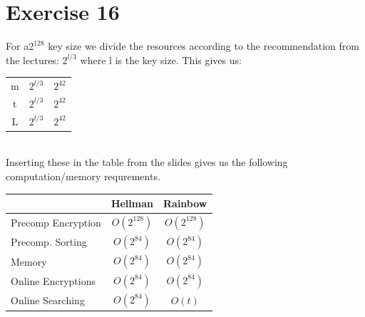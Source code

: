 \section*{Exercise 16}
For a$2^{128}$ key size we divide the resources according to the recommendation
from the lectures: $2^{l/3}$ where l is the key size. This gives us:\\
\begin{tabular}{c|c|c}
m & $2^{l/3} $&$ 2^{42}$\\
t & $2^{l/3} $&$ 2^{42}$\\
L & $2^{l/3} $&$ 2^{42}$
\end{tabular}\\
Inserting these in the table from the slides gives us the following
computation/memory requrements.\\
\begin{tabular}{l|cc}
\  & Hellman & Rainbow\\\hline
Precomp Encryption 	& $O(2^{128})$ & $O(2^{128})$\\
Precomp. Sorting 	& $O(2^{84})$ & $O(2^{84})$\\
Memory				& $O(2^{84})$ & $O(2^{84})$\\
Online Encryptions	& $O(2^{84})$ & $O(2^{84})$\\
Online Searching	& $O(2^{84})$ & $O(t)$\\
\end{tabular}
